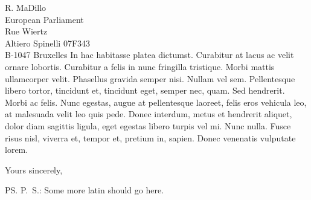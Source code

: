 \documentclass[a4paper,12pt]{letter}
\begin{document}
\begin{letter}{
    R. MaDillo\\
    European Parliament\\
    Rue Wiertz\\
    Altiero Spinelli 07F343\\
    B-1047 Bruxelles 
  }
  In hac habitasse platea dictumst. Curabitur at lacus ac velit ornare lobortis. 
  Curabitur a felis in nunc fringilla tristique. Morbi mattis ullamcorper velit. 
  Phasellus gravida semper nisi. Nullam vel sem. Pellentesque libero tortor, 
  tincidunt et, tincidunt eget, semper nec, quam. Sed hendrerit. Morbi ac felis. 
  Nunc egestas, augue at pellentesque laoreet, felis eros vehicula leo, at 
  malesuada velit leo quis pede. Donec interdum, metus et hendrerit aliquet, 
  dolor diam sagittis ligula, eget egestas libero turpis vel mi. Nunc nulla. 
  Fusce risus nisl, viverra et, tempor et, pretium in, sapien. Donec venenatis 
  vulputate lorem.

  \closing{Yours sincerely,}
%
  \ps{P.\ S.: Some more latin should go here.}

  \vspace{1cm}
  \begingroup
  \def\enotesize{\small}
  \def\enoteheading{\Large \textsc{Notes}}
  \theendnotes
  \endgroup
\end{letter}
\end{document}
